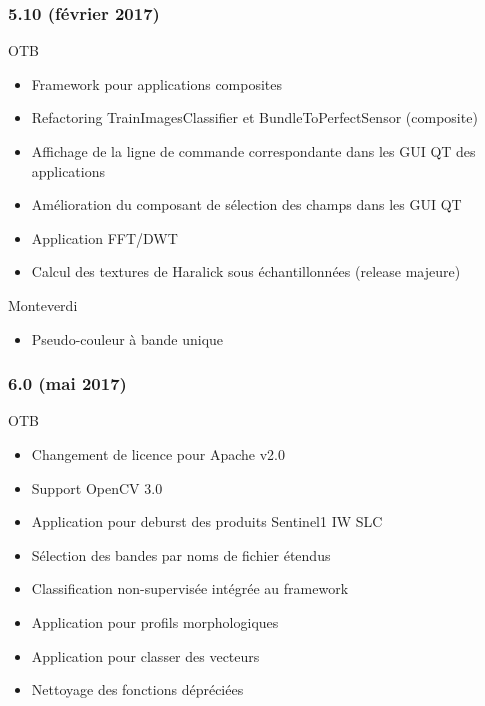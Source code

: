 \documentclass[8pt]{beamer}
\begin{document}
\begin{frame}
  \frametitle{5.10 (février 2017)}
  \begin{block}{OTB}
    \begin{itemize}
      \item Framework pour applications composites
      \item Refactoring TrainImagesClassifier et BundleToPerfectSensor (composite)
      \item Affichage de la ligne de commande correspondante dans les GUI QT des applications
      \item Amélioration du composant de sélection des champs dans les GUI QT
      \item Application FFT/DWT
      \item Calcul des textures de Haralick sous échantillonnées (release majeure)
    \end{itemize}
  \end{block}
  
  \begin{block}{Monteverdi}
    \begin{itemize}
      \item Pseudo-couleur à bande unique
      \end{itemize}
  \end{block}
      
\end{frame}

\begin{frame}
  \frametitle{6.0 (mai 2017)}
  \begin{block}{OTB}
    \begin{itemize}
      \item Changement de licence pour Apache v2.0
      \item Support OpenCV 3.0
      \item Application pour deburst des produits Sentinel1 IW SLC
      \item Sélection des bandes par noms de fichier étendus
      \item Classification non-supervisée intégrée au framework
      \item Application pour profils morphologiques
      \item Application pour classer des vecteurs
      \item Nettoyage des fonctions dépréciées
    \end{itemize}
    \end{block}
\end{frame}
\end{document}
